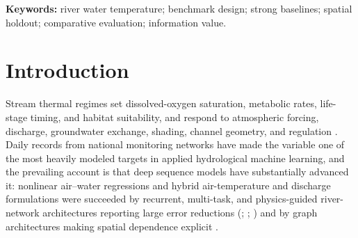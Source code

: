 \begin{abstract}
\begin{plainlanguagesummary}
River temperature changes slowly, so a forecast
repeating yesterday\textquotesingle s reading is already fairly accurate, and nudging it toward
the season\textquotesingle s usual value is better still. That makes the comparison a model is
judged against decisive. We tested predictions at 120 U.S. gauges under one
demanding evaluation: every model scored on exactly the same days and sites,
none allowed to see anything dated after its issue time. Judged
against the naive forecast all six methods looked about equally good and all
looked strong; judged against the slightly smarter one they separated, and one
established method proved no better than the simple rule it had appeared to beat
by a fifth. The days a method is allowed to skip, in studies that let it, are
also markedly harder than the days it keeps, so skipping flatters it. Separately
and more tentatively, what a model was \emph{given} mattered more than which method
it was: denying it the recent readings from the gauge it predicts cost 1.3 to
1.7 °C, against under 0.01 °C for switching model implementations. Much of what is reported as a modelling advance is, on this evidence, a
statement about the comparison and the days scored.
\end{plainlanguagesummary}
\end{abstract}

\noindent\textbf{Keywords:} river water temperature; benchmark design; strong baselines;
spatial holdout; comparative evaluation; information value.

\section{Introduction}\label{introduction}

Stream thermal regimes set dissolved-oxygen saturation, metabolic rates,
life-stage timing, and habitat suitability, and respond to atmospheric forcing,
discharge, groundwater exchange, shading, channel geometry, and regulation
\cite{caissie2006thermal}. Daily
records from national monitoring networks have made the variable one of the most
heavily modeled targets in applied hydrological machine learning, and the
prevailing account is that deep sequence models have substantially advanced it:
nonlinear air--water regressions
\cite{mohseni1998nonlinear} and hybrid
air-temperature and discharge formulations
\cite{toffolon2015hybrid}
were succeeded by recurrent, multi-task, and physics-guided river-network
architectures reporting large error reductions
(;
;
) and by graph
architectures making spatial dependence explicit
\cite{topp2023stream}.

